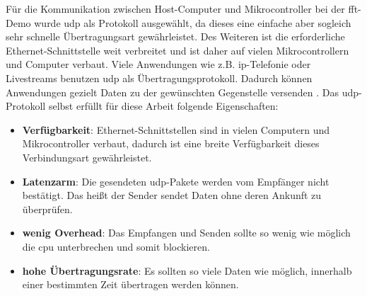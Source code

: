 \documentclass[../EDF Master Thesis.tex]{subfiles}
\begin{document}
    Für die Kommunikation zwischen Host-Computer und Mikrocontroller bei der \ac{fft}-Demo wurde \ac{udp} als Protokoll ausgewählt, da dieses eine einfache aber sogleich sehr schnelle Übertragungsart gewährleistet.
    Des Weiteren ist die erforderliche Ethernet-Schnittstelle weit verbreitet und ist daher auf vielen Mikrocontrollern und Computer verbaut.
    Viele Anwendungen wie z.B. \ac{ip}-Telefonie oder Livestreams benutzen \ac{udp} als Übertragungsprotokoll.
    Dadurch können Anwendungen gezielt Daten zu der gewünschten Gegenstelle versenden \parencite{elektronik_kompendium}.
    Das \ac{udp}-Protokoll selbst erfüllt für diese Arbeit folgende Eigenschaften:
    \begin{itemize}
        \item \textbf{Verfügbarkeit}: Ethernet-Schnittstellen sind in vielen Computern und Mikrocontroller verbaut, dadurch ist eine breite Verfügbarkeit dieses Verbindungsart gewährleistet.
        \item \textbf{Latenzarm}: Die gesendeten \ac{udp}-Pakete werden vom Empfänger nicht bestätigt. Das heißt der Sender sendet Daten ohne deren Ankunft zu überprüfen.
        \item \textbf{wenig Overhead}: Das Empfangen und Senden sollte so wenig wie möglich die \ac{cpu} unterbrechen und somit blockieren.
        \item \textbf{hohe Übertragungsrate}: Es sollten so viele Daten wie möglich, innerhalb einer bestimmten Zeit übertragen werden können.
    \end{itemize}
\end{document}
